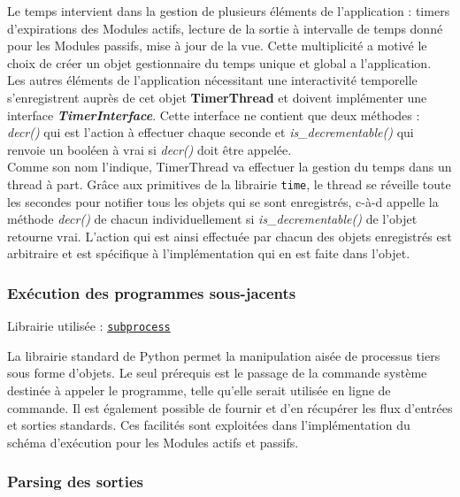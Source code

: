 \documentclass[]{article}
\begin{document}
\par Le temps intervient dans la gestion de plusieurs éléments de l'application : timers d'expirations des Modules actifs, lecture de la sortie à intervalle de temps donné pour les Modules passifs, mise à jour de la vue. Cette multiplicité a motivé le choix de créer un objet gestionnaire du temps unique et global a l'application. Les autres éléments de l'application nécessitant une interactivité temporelle s'enregistrent auprès de cet objet \textbf{TimerThread} et doivent implémenter une interface \textbf{\textit{TimerInterface}}. Cette interface ne contient que deux méthodes : \textit{decr()} qui est l'action à effectuer chaque seconde et \textit{is\_decrementable()} qui renvoie un booléen à vrai si \textit{decr()} doit être appelée.\\

Comme son nom l'indique, TimerThread va effectuer la gestion du temps dans un thread à part. Grâce aux primitives de la librairie \texttt{time}, le thread se réveille toute les secondes pour notifier tous les objets qui se sont enregistrés, c-à-d appelle la méthode \textit{decr()} de chacun individuellement si \textit{is\_decrementable()} de l'objet retourne vrai. L'action qui est ainsi effectuée par chacun des objets enregistrés est arbitraire et est spécifique à l'implémentation qui en est faite dans l'objet.

\subsubsection{Exécution des programmes sous-jacents}

\noindent Librairie utilisée : \href{https://docs.python.org/fr/3/library/subprocess.html}{\texttt{subprocess}}\\

\par La librairie standard de Python permet la manipulation aisée de processus tiers sous forme d'objets. Le seul prérequis est le passage de la commande système destinée à appeler le programme, telle qu'elle serait utilisée en ligne de commande. Il est également possible de fournir et d'en récupérer les flux d'entrées et sorties standards. Ces facilités sont exploitées dans l'implémentation du schéma d'exécution pour les Modules actifs et passifs. 

\subsubsection{Parsing des sorties}
\end{document}
